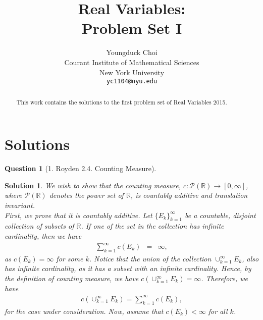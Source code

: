 \documentclass{article} %
\title{Real Variables: \\
Problem Set I}
\author{
Youngduck Choi \\
Courant Institute of Mathematical Sciences \\
New York University \\
\texttt{yc1104@nyu.edu} \\
}
\theoremstyle{quest}
\newtheorem*{question}{Question}
\newtheorem*{solution}{Solution}
\begin{document}
\maketitle

\begin{abstract}
This work contains the solutions to the first problem set of Real Variables 2015.
\end{abstract}

\section{Solutions}
\begin{question}[1. Royden 2.4. Counting Measure]
\end{question}
\begin{solution}
We wish to show that the counting measure, $c: \mathcal{P}(\mathbb{R}) 
\to [0,\infty]$, where $\mathcal{P}(\mathbb{R})$ denotes the power set of $\mathbb{R}$, is
countably additive and translation invariant. \\ 

First, we prove that it is countably additive. Let $\{ E_k \}_{k=1}^{\infty}$ be a countable,
disjoint collection of subsets of $\mathbb{R}$. 
If one of the set in the collection has infinite cardinality, then 
we have  
\begin{eqnarray*}
\sum_{k=1}^{\infty} c(E_k) &=& \infty,
\end{eqnarray*}
as $c(E_k) = \infty$ for some $k$. Notice that the union of the collection $\cup_{k=1}^{\infty} E_k$,
also has infinite cardinality, as it has a subset with an infinite cardinality. Hence, by the definition
of counting measure, we have
$c(\cup_{k=1}^{\infty}E_k) = \infty$. Therefore, we have
\begin{eqnarray*}
c(\cup_{k=1}^{\infty}E_k) = \sum_{k=1}^{\infty} c(E_k),
\end{eqnarray*}
for the case under consideration. Now, assume that $c(E_k) < \infty$ for all $k$.


\end{solution}

\pagebreak
\end{document}
